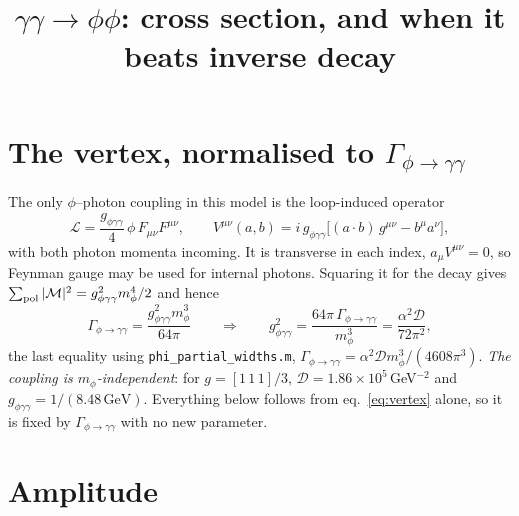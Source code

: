 \documentclass{article}
\title{$\gamma\gamma\to\phi\phi$: cross section, and when it beats inverse decay}
\date{}
\newcommand{\Ggg}{\Gamma_{\phi\to\gamma\gamma}}
\newcommand{\Ds}{\mathcal{D}}
\begin{document}
\maketitle

\noindent{}


\section{The vertex, normalised to $\Ggg$}

The only $\phi$--photon coupling in this model is the loop-induced operator
%
\begin{equation}
  \mathcal{L} = \frac{g_{\phi\gamma\gamma}}{4}\,\phi\,F_{\mu\nu}F^{\mu\nu},
  \qquad
  V^{\mu\nu}(a,b) = i\,g_{\phi\gamma\gamma}\big[(a\!\cdot\! b)\,g^{\mu\nu} - b^\mu a^\nu\big],
  \label{eq:vertex}
\end{equation}
%
with both photon momenta incoming. It is transverse in each index,
$a_\mu V^{\mu\nu}=0$, so Feynman gauge may be used for internal photons.
Squaring it for the decay gives $\sum_{\rm pol}|\mathcal{M}|^2 =
g_{\phi\gamma\gamma}^2 m_\phi^4/2$ and hence
%
\begin{equation}
  \Ggg = \frac{g_{\phi\gamma\gamma}^2 m_\phi^3}{64\pi}
  \qquad\Longrightarrow\qquad
  g_{\phi\gamma\gamma}^2 = \frac{64\pi\,\Ggg}{m_\phi^3}
  = \frac{\alpha^2\Ds}{72\pi^2},
  \label{eq:gnorm}
\end{equation}
%
the last equality using \texttt{phi\_partial\_widths.m},
$\Ggg=\alpha^2\Ds m_\phi^3/(4608\pi^3)$. \emph{The coupling is
$m_\phi$-independent}: for $g=[1\,1\,1]/3$, $\Ds=1.86\times10^5\,$GeV$^{-2}$
and $g_{\phi\gamma\gamma}=1/(8.48\,\mathrm{GeV})$. Everything below follows
from eq.~\eqref{eq:vertex} alone, so it is fixed by $\Ggg$ with no new
parameter.

\section{Amplitude}
\end{document}

